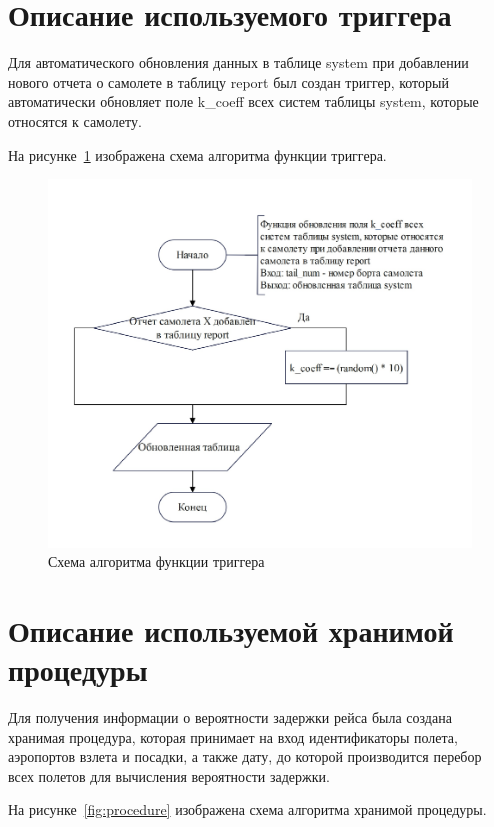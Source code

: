 \section{Описание используемого триггера}

Для автоматического обновления данных в таблице system при добавлении нового отчета о самолете в таблицу report был создан триггер, который автоматически обновляет поле k\_coeff всех систем таблицы system, которые относятся к самолету.

На рисунке~\ref{fig:trigger} изображена схема алгоритма функции триггера.

\begin{figure}[H]
    \centering
    \includegraphics[scale=0.8]{inc/Drawing4}
    \caption{Схема алгоритма функции триггера}
    \label{fig:trigger}
\end{figure}

\section{Описание используемой хранимой \newline процедуры}

Для получения информации о вероятности задержки рейса была создана хранимая процедура, которая принимает на вход идентификаторы полета, аэропортов взлета и посадки, а также дату, до которой производится перебор всех полетов для вычисления вероятности задержки.

На рисунке~\ref{fig:procedure} изображена схема алгоритма хранимой процедуры.

